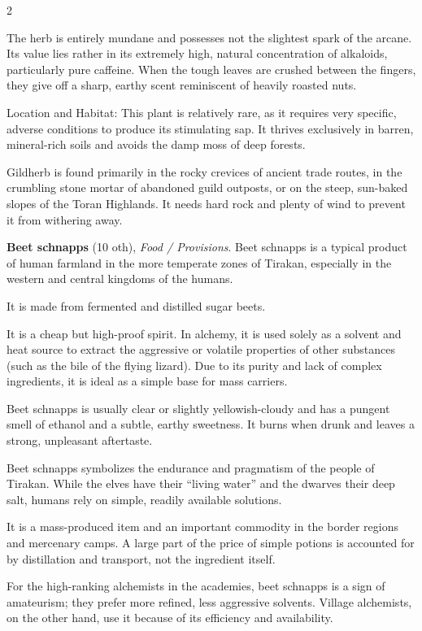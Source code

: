 \begin{multicols}{2}
\begin{denseitemize}
The herb is entirely mundane and possesses not the slightest spark of the arcane. Its value lies rather in its extremely high, natural concentration of alkaloids, particularly pure caffeine. When the tough leaves are crushed between the fingers, they give off a sharp, earthy scent reminiscent of heavily roasted nuts.

Location and Habitat:
This plant is relatively rare, as it requires very specific, adverse conditions to produce its stimulating sap. It thrives exclusively in barren, mineral-rich soils and avoids the damp moss of deep forests.

Gildherb is found primarily in the rocky crevices of ancient trade routes, in the crumbling stone mortar of abandoned guild outposts, or on the steep, sun-baked slopes of the Toran Highlands. It needs hard rock and plenty of wind to prevent it from withering away.
        \item \textbf{Beet schnapps} (10 oth), \textit{Food / Provisions}.
        Beet schnapps is a typical product of human farmland in the more temperate zones of Tirakan, especially in the western and central kingdoms of the humans.

It is made from fermented and distilled sugar beets.

It is a cheap but high-proof spirit. In alchemy, it is used solely as a solvent and heat source to extract the aggressive or volatile properties of other substances (such as the bile of the flying lizard). Due to its purity and lack of complex ingredients, it is ideal as a simple base for mass carriers.

Beet schnapps is usually clear or slightly yellowish-cloudy and has a pungent smell of ethanol and a subtle, earthy sweetness. It burns when drunk and leaves a strong, unpleasant aftertaste.

Beet schnapps symbolizes the endurance and pragmatism of the people of Tirakan. While the elves have their “living water” and the dwarves their deep salt, humans rely on simple, readily available solutions.

It is a mass-produced item and an important commodity in the border regions and mercenary camps. A large part of the price of simple potions is accounted for by distillation and transport, not the ingredient itself.

For the high-ranking alchemists in the academies, beet schnapps is a sign of amateurism; they prefer more refined, less aggressive solvents. Village alchemists, on the other hand, use it because of its efficiency and availability.
    \end{denseitemize}



\end{multicols}
